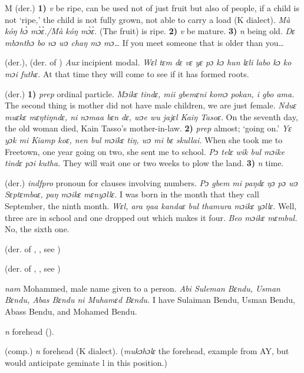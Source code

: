 \begin{letter}{M}
 (der.) \textbf{1)} \textit{v} be ripe, can be used not of just fruit but also of people, if a child is not ‘ripe,' the child is not fully grown, not able to carry a load (K dialect). \textit{Mà kóŋ hɔ̀ mɔ̀ɛ̀./Mà kóŋ mɔ̀ɛ̀.} (The fruit) is ripe. \textbf{2)} \textit{v} be mature. \textbf{3)} \textit{n} being old. \textit{Dɛ mbɔnthɔ bo nɔ wɔ chaŋ mɔ mɔ…} If you meet someone that is older than you… 

 (der.), (der. of ) \textit{Aux} incipient modal. \textit{Wɛl tɛm dɛ vɛ yɛ pɔ kɔ hun lɛli labo kɔ ko mɔi futhɛ.} At that time they will come to see if it has formed roots. 

 (der.) \textbf{1)} \textit{prep} ordinal particle. \textit{Mɔikɛ tindɛ, mii gbemɛni komɔ pokan, i gbo ama.} The second thing is mother did not have male children, we are just female. \textit{Nduɛ muɛkɛ mɛŋtiŋndɛ, ni nɔmaa bɛn dɛ, wɔe wu jajɛl Kaiŋ Tasoɛ.} On the seventh day, the old woman died, Kain Tasso's mother-in-law. \textbf{2)} \textit{prep} almost; ‘going on.' \textit{Yɛ yɔk mi Kiamp koɛ, nen bul mɔikɛ tiŋ, wɔ mi bɛ skullai.} When she took me to Freetown, one year going on two, she sent me to school. \textit{Pɔ telɛ wik bul mɔike tindɛ pɔi kutha.} They will wait one or two weeks to plow the land. \textbf{3)} \textit{n} time.

 (der.) \textit{indfpro} pronoun for clauses involving numbers. \textit{Pɔ gbem mi paŋdɛ ŋɔ pɔ wɔ Sɛptɛmbaɛ, paŋ mɔikɛ mɛnyɔllɛ.} I was born in the month that they call September, the ninth month. \textit{Wɛl, ara ŋaa kandaɛ bul thamura mɔikɛ yɔllɛ.} Well, three are in school and one dropped out which makes it four. \textit{Beo mɔikɛ mɛmbul.} No, the sixth one.

 (der. of , , see ) 

 (der. of , , see ) 

 \textit{nam} Mohammed, male name given to a person. \textit{Abi Suleman Bɛndu, Usman Bɛndu, Abas Bɛndu ni Muhamɛd Bɛndu.} I have Sulaiman Bendu, Usman Bendu, Abass Bendu, and Mohamed Bendu.

 \textit{n} forehead (\citealt{Pichl1967}).

 (comp.) \textit{n} forehead (K dialect). (\textit{mukɔhɔlɛ} the forehead, example from AY, but would anticipate geminate l in this position.)


\end{letter}
